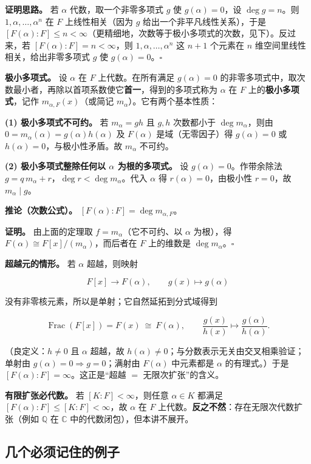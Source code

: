 \textbf{证明思路。} 若 $\alpha$ 代数，取一个非零多项式 $g$ 使 $g(\alpha)=0$，设 $\deg g=n$。则 $1,\alpha,\dots,\alpha^n$ 在 $F$ 上线性相关（因为 $g$ 给出一个非平凡线性关系），于是 $[F(\alpha):F]\le n<\infty$（更精细地，次数等于极小多项式的次数，见下）。反过来，若 $[F(\alpha):F]=n<\infty$，则 $1,\alpha,\dots,\alpha^n$ 这 $n+1$ 个元素在 $n$ 维空间里线性相关，给出非零多项式 $g$ 使 $g(\alpha)=0$。$\square$

\textbf{极小多项式。} 设 $\alpha$ 在 $F$ 上代数。在所有满足 $g(\alpha)=0$ 的非零多项式中，取次数最小者，再除以首项系数使它\textbf{首一}，得到的多项式称为 $\alpha$ 在 $F$ 上的\textbf{极小多项式}，记作 $m_{\alpha,F}(x)$（或简记 $m_\alpha$）。它有两个基本性质：

\textbf{(1) 极小多项式不可约。} 若 $m_\alpha=gh$ 且 $g,h$ 次数都小于 $\deg m_\alpha$，则由 $0=m_\alpha(\alpha)=g(\alpha)h(\alpha)$ 及 $F(\alpha)$ 是域（无零因子）得 $g(\alpha)=0$ 或 $h(\alpha)=0$，与极小性矛盾。故 $m_\alpha$ 不可约。

\textbf{(2) 极小多项式整除任何以 $\alpha$ 为根的多项式。} 设 $g(\alpha)=0$。作带余除法 $g=q\,m_\alpha+r$，$\deg r<\deg m_\alpha$。代入 $\alpha$ 得 $r(\alpha)=0$，由极小性 $r=0$，故 $m_\alpha\mid g$。

\textbf{推论（次数公式）。} $[F(\alpha):F]=\deg m_{\alpha,F}$。

\textbf{证明。} 由上面的定理取 $f=m_\alpha$（它不可约、以 $\alpha$ 为根），得 $F(\alpha)\cong F[x]/(m_\alpha)$，而后者在 $F$ 上的维数是 $\deg m_\alpha$。$\square$

\textbf{超越元的情形。} 若 $\alpha$ 超越，则映射

\[
F[x]\longrightarrow F(\alpha),\qquad g(x)\longmapsto g(\alpha)
\]

没有非零核元素，所以是单射；它自然延拓到分式域得到

\[
\operatorname{Frac}(F[x])=F(x)\ \cong\ F(\alpha),\qquad \frac{g(x)}{h(x)}\longmapsto\frac{g(\alpha)}{h(\alpha)}.
\]

（良定义：$h\ne0$ 且 $\alpha$ 超越，故 $h(\alpha)\ne0$；与分数表示无关由交叉相乘验证；单射由 $g(\alpha)=0\Rightarrow g=0$；满射由 $F(\alpha)$ 中元素都是 $\alpha$ 的有理式。）于是 $[F(\alpha):F]=\infty$。这正是“超越 $=$ 无限次扩张”的含义。

\textbf{有限扩张必代数。} 若 $[K:F]<\infty$，则任意 $\alpha\in K$ 都满足 $[F(\alpha):F]\le[K:F]<\infty$，故 $\alpha$ 在 $F$ 上代数。\textbf{反之不然}：存在无限次代数扩张（例如 $\mathbb Q$ 在 $\mathbb C$ 中的代数闭包），但本讲不展开。

\subsection{几个必须记住的例子}


